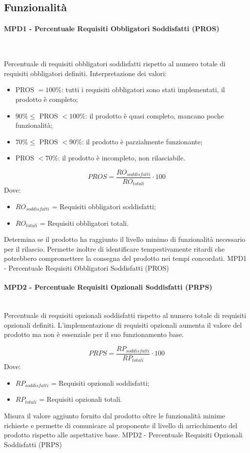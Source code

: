 \documentclass[10pt, letterpaper]{article}
\newcommand{\trisubsection}[1]{\paragraph{#1}\mbox{}\\}
\begin{document}
\subsection{Funzionalità}
\trisubsection{MPD1 -  Percentuale Requisiti Obbligatori Soddisfatti (PROS)}
{Percentuale di requisiti obbligatori soddisfatti rispetto al numero totale
    di requisiti obbligatori definiti.
    Interpretazione dei valori:
    \begin{itemize}
        \item PROS $= 100\%$: tutti i requisiti obbligatori sono stati
              implementati, il prodotto è completo;
        \item $90\% \leq $ PROS $ < 100\%$: il prodotto è quasi completo,
              mancano poche funzionalità;
        \item $70\% \leq $ PROS $ < 90\%$: il prodotto è parzialmente funzionante;
        \item PROS $< 70\%$: il prodotto è incompleto, non rilasciabile.
    \end{itemize}}
{\[ PROS =  \frac{RO_{soddisfatti}}{RO_{totali}} \cdot 100\]
    Dove:
    \begin{itemize}
        \item $RO_{soddisfatti}$ = Requisiti obbligatori soddisfatti;
        \item $RO_{totali}$ = Requisiti obbligatori totali.
    \end{itemize}
}
{Determina se il prodotto ha raggiunto il livello minimo di funzionalità
    necessario per il rilascio. Permette inoltre di
    identificare tempestivamente ritardi che potrebbero compromettere la
    consegna del prodotto nei tempi concordati.}
{MPD1 - Percentuale Requisiti Obbligatori Soddisfatti (PROS)}

\trisubsection{MPD2 -  Percentuale Requisiti Opzionali Soddisfatti (PRPS)}
{Percentuale di requisiti opzionali soddisfatti rispetto al numero totale
    di requisiti opzionali definiti.
    L'implementazione di requisiti opzionali
    aumenta il valore del prodotto ma non è essenziale per il suo funzionamento base.}
{\[ PRPS =  \frac{RP_{soddisfatti}}{RP_{totali}} \cdot 100\]
    Dove:
    \begin{itemize}
        \item $RP_{soddisfatti}$ = Requisiti opzionali soddisfatti;
        \item $RP_{totali}$ = Requisiti opzionali totali.
    \end{itemize}
}
{Misura il valore aggiunto fornito dal prodotto oltre le funzionalità minime
    richieste e permette di comunicare al proponente il livello
    di arricchimento del prodotto rispetto alle aspettative base.}
{MPD2 - Percentuale Requisiti Opzionali Soddisfatti (PRPS)}
\end{document}
